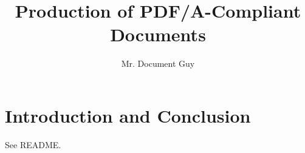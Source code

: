 \documentclass{article}
\begin{document}
\author{Mr. Document Guy}
\title{Production of PDF/A-Compliant Documents}
\maketitle

\section{Introduction and Conclusion}

See README.
\end{document}
